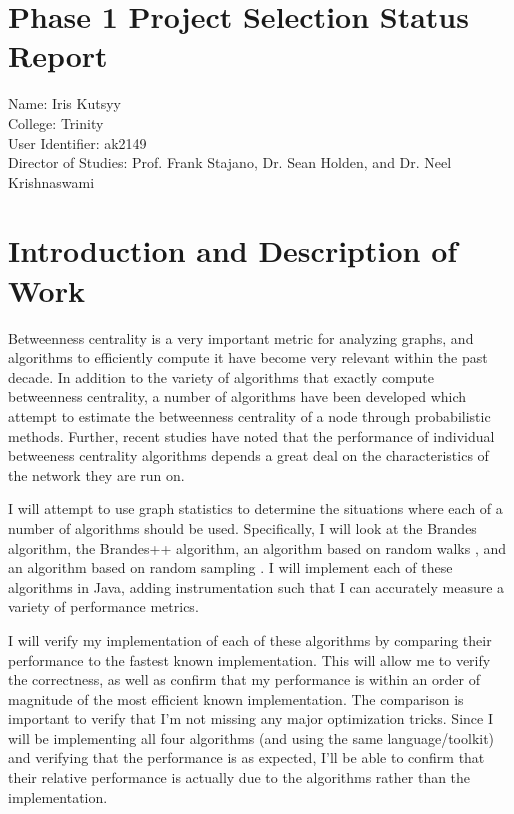 \documentclass[a4paper,12pt]{article}
\begin{document}
\section*{Phase 1 Project Selection Status Report}

\noindent
Name: Iris Kutsyy\\

\noindent
College: Trinity\\

\noindent
User Identifier: ak2149\\

\noindent
Director of Studies: Prof. Frank Stajano, Dr. Sean Holden, and Dr. Neel Krishnaswami
\section{Introduction and Description of Work}
Betweenness centrality is a very important metric for analyzing graphs, and algorithms to efficiently compute it have become very relevant within the past decade. In addition to the variety of algorithms that exactly compute betweenness centrality, a number of algorithms have been developed which attempt to estimate the betweenness centrality of a node through probabilistic methods. Further, recent studies have noted that the performance of individual betweeness centrality algorithms depends a great deal on the characteristics of the network they are run on.

I will attempt to use graph statistics to determine the situations where each of a number of algorithms should be used. Specifically, I will look at the Brandes \cite{doi:10.1080/0022250X.2001.9990249} algorithm, the Brandes++ \cite{erdos2015divideandconquer} algorithm, an algorithm based on random walks \cite{NEWMAN200539}, and an algorithm based on random sampling \cite{inproceedings}. I will implement each of these algorithms in Java, adding instrumentation such that I can accurately measure a variety of performance metrics.

I will verify my implementation of each of these algorithms by comparing their performance to the fastest known implementation. This will allow me to verify the correctness, as well as confirm that my performance is within an order of magnitude of the most efficient known implementation. The comparison is important to verify that I'm not missing any major optimization tricks. Since I will be implementing all four algorithms (and using the same language/toolkit) and verifying that the performance is as expected, I'll be able to confirm that their relative performance is actually due to the algorithms rather than the implementation.
\end{document}
